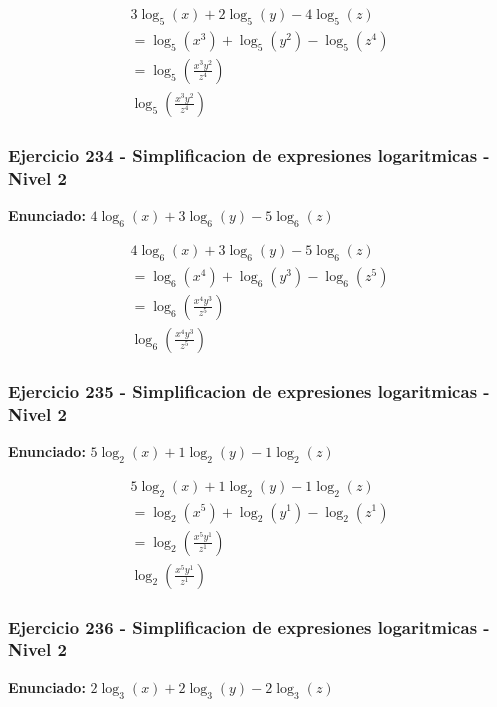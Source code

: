 \documentclass[12pt,a4paper]{article}
\begin{document}
\[
\begin{aligned}
3\log_{5}\left(x\right)+2\log_{5}\left(y\right)-4\log_{5}\left(z\right)\\
=\log_{5}\left(x^{3}\right)+\log_{5}\left(y^{2}\right)-\log_{5}\left(z^{4}\right)\\
=\log_{5}\left(\frac{x^{3}y^{2}}{z^{4}}\right)\\
\boxed{\log_{5}\left(\frac{x^{3}y^{2}}{z^{4}}\right)}
\end{aligned}
\]


\subsubsection*{Ejercicio 234 - Simplificacion de expresiones logaritmicas - Nivel 2}
\textbf{Enunciado:} \(4\log_{6}\left(x\right)+3\log_{6}\left(y\right)-5\log_{6}\left(z\right)\)

\[
\begin{aligned}
4\log_{6}\left(x\right)+3\log_{6}\left(y\right)-5\log_{6}\left(z\right)\\
=\log_{6}\left(x^{4}\right)+\log_{6}\left(y^{3}\right)-\log_{6}\left(z^{5}\right)\\
=\log_{6}\left(\frac{x^{4}y^{3}}{z^{5}}\right)\\
\boxed{\log_{6}\left(\frac{x^{4}y^{3}}{z^{5}}\right)}
\end{aligned}
\]


\subsubsection*{Ejercicio 235 - Simplificacion de expresiones logaritmicas - Nivel 2}
\textbf{Enunciado:} \(5\log_{2}\left(x\right)+1\log_{2}\left(y\right)-1\log_{2}\left(z\right)\)

\[
\begin{aligned}
5\log_{2}\left(x\right)+1\log_{2}\left(y\right)-1\log_{2}\left(z\right)\\
=\log_{2}\left(x^{5}\right)+\log_{2}\left(y^{1}\right)-\log_{2}\left(z^{1}\right)\\
=\log_{2}\left(\frac{x^{5}y^{1}}{z^{1}}\right)\\
\boxed{\log_{2}\left(\frac{x^{5}y^{1}}{z^{1}}\right)}
\end{aligned}
\]


\subsubsection*{Ejercicio 236 - Simplificacion de expresiones logaritmicas - Nivel 2}
\textbf{Enunciado:} \(2\log_{3}\left(x\right)+2\log_{3}\left(y\right)-2\log_{3}\left(z\right)\)
\end{document}

